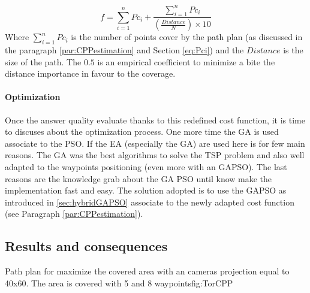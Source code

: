   \begin{equation} \label{eq:CostF2}
f=\sum_{i=1}^{n}Pc_i + \frac{\sum_{i=1}^{n}Pc_i}{(\frac{Distance}{N})\times 10}  
\end{equation}  
Where $\sum_{i=1}^{n}Pc_i$ is the number of points cover by the path plan (as discussed in the paragraph \ref{par:CPPestimation} and  Section \ref{eq:Pci}) and the $Distance$  is  the size of the path. The $0.5$ is an empirical coefficient to minimize a bite the distance importance in favour to the coverage.



\paragraph*{Optimization}
 Once the answer quality evaluate thanks to this redefined cost function, it is time to discuses about the optimization process.
One more time the GA is used associate to the PSO. If the EA (especially the GA) are used here is for few main reasons. The GA was the best algorithms to solve the TSP problem and also well adapted to the waypoints positioning (even more with an GAPSO). The last reasons are the knowledge grab about the GA PSO until know make the implementation fast and easy.
 The solution adopted is to use the GAPSO as introduced in \ref{sec:hybridGAPSO} associate to the newly adapted cost function (see Paragraph \ref{par:CPPestimation}).


		\subsection{Results  and consequences }
\begin{mfigures}[!]{Path plan for maximize the covered area with an cameras projection  equal to 40x60. The area is covered  with 5 and 8 waypoints}{fig:TorCPP} \centering
{}
\hspace{1cm}

\hspace{1cm}
\end{mfigures}
		
